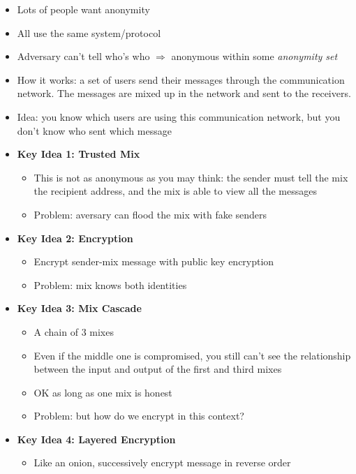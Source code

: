 \begin{itemize}
    \item Lots of people want anonymity
    \item All use the same system/protocol
    \item Adversary can't tell who's who $\Rightarrow$ anonymous within some {\it anonymity set}
    \item How it works: a set of users send their messages through the communication network. The messages are mixed up in the network and sent to the receivers.
    \item Idea: you know which users are using this communication network, but you don't know who sent which message
     \item {\bf Key Idea 1: Trusted Mix} \begin{itemize}
                  \item This is not as anonymous as you may think: the sender must tell the mix the recipient address, and the mix is able to view all the messages
                  \item Problem: aversary can flood the mix with fake senders
              \end{itemize}
     \item {\bf Key Idea 2: Encryption} \begin{itemize}
                  \item Encrypt sender-mix message with public key encryption
                  \item Problem: mix knows both identities
              \end{itemize}
     \item {\bf Key Idea 3: Mix Cascade} \begin{itemize}
                  \item A chain of 3 mixes
                  \item Even if the middle one is compromised, you still can't see the relationship between the input and output of the first and third mixes
                  \item OK as long as one mix is honest
                  \item Problem: but how do we encrypt in this context?
              \end{itemize}
     \item {\bf Key Idea 4: Layered Encryption} \begin{itemize}
                  \item Like an onion, successively encrypt message in reverse order

\end{itemize}
\end{itemize}
